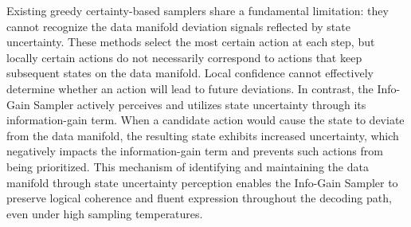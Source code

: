 Existing greedy certainty-based samplers share a fundamental limitation: they cannot recognize the data manifold deviation signals reflected by state uncertainty. These methods select the most certain action at each step, but locally certain actions do not necessarily correspond to actions that keep subsequent states on the data manifold. Local confidence cannot effectively determine whether an action will lead to future deviations. In contrast, the Info-Gain Sampler actively perceives and utilizes state uncertainty through its information-gain term. When a candidate action would cause the state to deviate from the data manifold, the resulting state exhibits increased uncertainty, which negatively impacts the information-gain term and prevents such actions from being prioritized. This mechanism of identifying and maintaining the data manifold through state uncertainty perception enables the Info-Gain Sampler to preserve logical coherence and fluent expression throughout the decoding path, even under high sampling temperatures.

